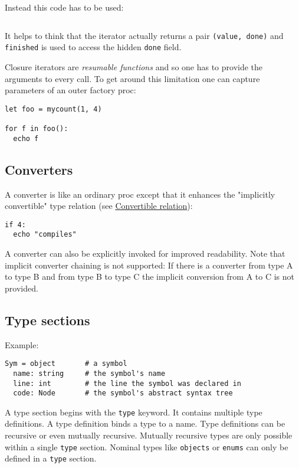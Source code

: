 Instead this code has to be used:

\begin{verbatim}
\end{verbatim}

It helps to think that the iterator actually returns a pair
\texttt{(value,\ done)} and \texttt{finished} is used to access the
hidden \texttt{done} field.

Closure iterators are \emph{resumable functions} and so one has to
provide the arguments to every call. To get around this limitation one
can capture parameters of an outer factory proc:

\begin{verbatim}
let foo = mycount(1, 4)

for f in foo():
  echo f
\end{verbatim}

\hypertarget{converters}{%
\subsection{Converters}\label{converters}}

A converter is like an ordinary proc except that it enhances the
"implicitly convertible" type relation (see
\protect\hyperlink{convertible-relation}{Convertible relation}):

\begin{verbatim}
if 4:
  echo "compiles"
\end{verbatim}

A converter can also be explicitly invoked for improved readability.
Note that implicit converter chaining is not supported: If there is a
converter from type A to type B and from type B to type C the implicit
conversion from A to C is not provided.

\hypertarget{type-sections}{%
\subsection{Type sections}\label{type-sections}}

Example:

\begin{verbatim}
Sym = object       # a symbol
  name: string     # the symbol's name
  line: int        # the line the symbol was declared in
  code: Node       # the symbol's abstract syntax tree
\end{verbatim}

A type section begins with the \texttt{type} keyword. It contains
multiple type definitions. A type definition binds a type to a name.
Type definitions can be recursive or even mutually recursive. Mutually
recursive types are only possible within a single \texttt{type} section.
Nominal types like \texttt{objects} or \texttt{enums} can only be
defined in a \texttt{type} section.

